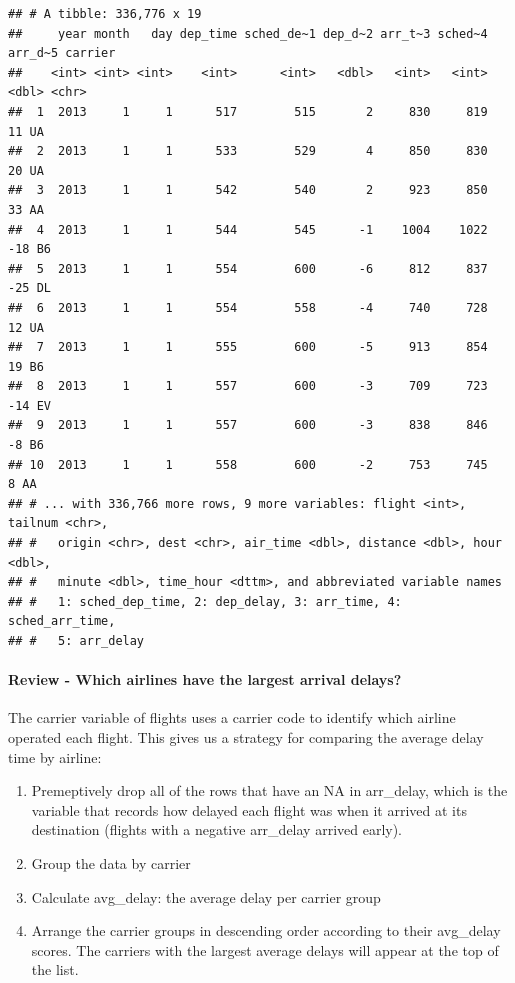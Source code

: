 \documentclass[
]{article}
\providecommand{\tightlist}{%
  \setlength{\itemsep}{0pt}\setlength{\parskip}{0pt}}
\begin{document}
\begin{verbatim}
## # A tibble: 336,776 x 19
##     year month   day dep_time sched_de~1 dep_d~2 arr_t~3 sched~4 arr_d~5 carrier
##    <int> <int> <int>    <int>      <int>   <dbl>   <int>   <int>   <dbl> <chr>  
##  1  2013     1     1      517        515       2     830     819      11 UA     
##  2  2013     1     1      533        529       4     850     830      20 UA     
##  3  2013     1     1      542        540       2     923     850      33 AA     
##  4  2013     1     1      544        545      -1    1004    1022     -18 B6     
##  5  2013     1     1      554        600      -6     812     837     -25 DL     
##  6  2013     1     1      554        558      -4     740     728      12 UA     
##  7  2013     1     1      555        600      -5     913     854      19 B6     
##  8  2013     1     1      557        600      -3     709     723     -14 EV     
##  9  2013     1     1      557        600      -3     838     846      -8 B6     
## 10  2013     1     1      558        600      -2     753     745       8 AA     
## # ... with 336,766 more rows, 9 more variables: flight <int>, tailnum <chr>,
## #   origin <chr>, dest <chr>, air_time <dbl>, distance <dbl>, hour <dbl>,
## #   minute <dbl>, time_hour <dttm>, and abbreviated variable names
## #   1: sched_dep_time, 2: dep_delay, 3: arr_time, 4: sched_arr_time,
## #   5: arr_delay
\end{verbatim}

\hypertarget{review---which-airlines-have-the-largest-arrival-delays}{%
\paragraph{Review - Which airlines have the largest arrival
delays?}\label{review---which-airlines-have-the-largest-arrival-delays}}

The carrier variable of flights uses a carrier code to identify which
airline operated each flight. This gives us a strategy for comparing the
average delay time by airline:

\begin{enumerate}
\def\labelenumi{\arabic{enumi}.}
\tightlist
\item
  Premeptively drop all of the rows that have an NA in arr\_delay, which
  is the variable that records how delayed each flight was when it
  arrived at its destination (flights with a negative arr\_delay arrived
  early).
\item
  Group the data by carrier
\item
  Calculate avg\_delay: the average delay per carrier group
\item
  Arrange the carrier groups in descending order according to their
  avg\_delay scores. The carriers with the largest average delays will
  appear at the top of the list.
\end{enumerate}
\end{document}
